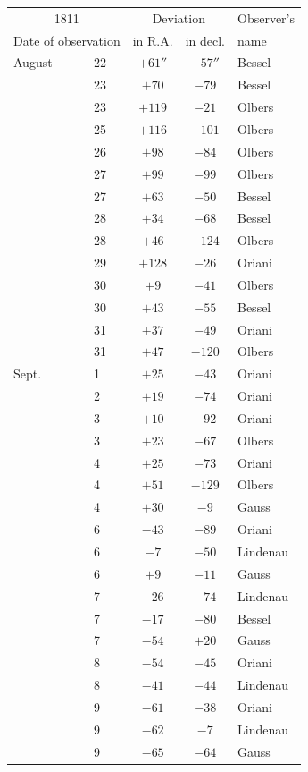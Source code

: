 \begin{center}

\fontsize{10}{12}\selectfont\setlength{\tabcolsep}{7pt}\renewcommand{\arraystretch}{1.05}\begin{tabular}{ll|c|c|l}
\multicolumn{2}{c|}{1811} & \multicolumn{2}{c|}{Deviation} & Observer’s \\
\multicolumn{2}{c|}{Date of observation} & in R.A. & in decl. & name \\\hline
August & 22 & $+61''$ & $-57''$ & Bessel \\
 & 23 & $+70$ & $-79$ & Bessel \\
 & 23 & $+119$ & $-21$ & Olbers \\
 & 25 & $+116$ & $-101$ & Olbers \\
 & 26 & $+98$ & $-84$ & Olbers \\
 & 27 & $+99$ & $-99$ & Olbers \\
 & 27 & $+63$ & $-50$ & Bessel \\
 & 28 & $+34$ & $-68$ & Bessel \\
 & 28 & $+46$ & $-124$ & Olbers \\
 & 29 & $+128$ & $-26$ & Oriani \\
 & 30 & $+9$ & $-41$ & Olbers \\
 & 30 & $+43$ & $-55$ & Bessel \\
 & 31 & $+37$ & $-49$ & Oriani \\
 & 31 & $+47$ & $-120$ & Olbers \\
Sept. & 1 & $+25$ & $-43$ & Oriani \\
 & 2 & $+19$ & $-74$ & Oriani \\
 & 3 & $+10$ & $-92$ & Oriani \\
 & 3 & $+23$ & $-67$ & Olbers \\
 & 4 & $+25$ & $-73$ & Oriani \\
 & 4 & $+51$ & $-129$ & Olbers \\
 & 4 & $+30$ & $-9$ & Gauss \\
 & 6 & $-43$ & $-89$ & Oriani \\
 & 6 & $-7$ & $-50$ & Lindenau \\
 & 6 & $+9$ & $-11$ & Gauss \\
 & 7 & $-26$ & $-74$ & Lindenau \\
 & 7 & $-17$ & $-80$ & Bessel \\
 & 7 & $-54$ & $+20$ & Gauss \\
 & 8 & $-54$ & $-45$ & Oriani \\
 & 8 & $-41$ & $-44$ & Lindenau \\
 & 9 & $-61$ & $-38$ & Oriani \\
 & 9 & $-62$ & $-7$ & Lindenau \\
 & 9 & $-65$ & $-64$ & Gauss \\
\end{tabular}
\end{center}
